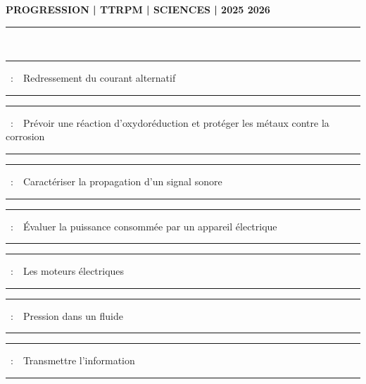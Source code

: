 \documentclass[11pt,a4paper]{article}
\newcounter{numchap}%
\newcommand{\chap}[1]{%
\addtocounter{numchap}{1}%
\textcolor{black}{Chapitre\,\thenumchap\,}\,#1%
}
\newcommand{\chapitre}[1]
{


\hrule
\vspace{5mm}
\large{ \chap~:~~#1 }
\vspace{5mm}
\hrule

\vfill 

}
\begin{document}
\center \LARGE{ \textbf{PROGRESSION | TTRPM | SCIENCES | 2025 2026}}
\\[0,5cm]

\normalsize

\hrule\

\vspace{1cm}

\begin{center}


\chapitre{Redressement du courant alternatif}
\chapitre{Prévoir une réaction d'oxydoréduction et protéger les métaux contre la corrosion}
\chapitre{Caractériser la propagation d'un signal sonore}
\chapitre{Évaluer la puissance consommée par un appareil électrique}
\chapitre{Les moteurs électriques }
\chapitre{Pression dans un fluide}
\chapitre{Transmettre l'information}



\end{center}
\end{document}
